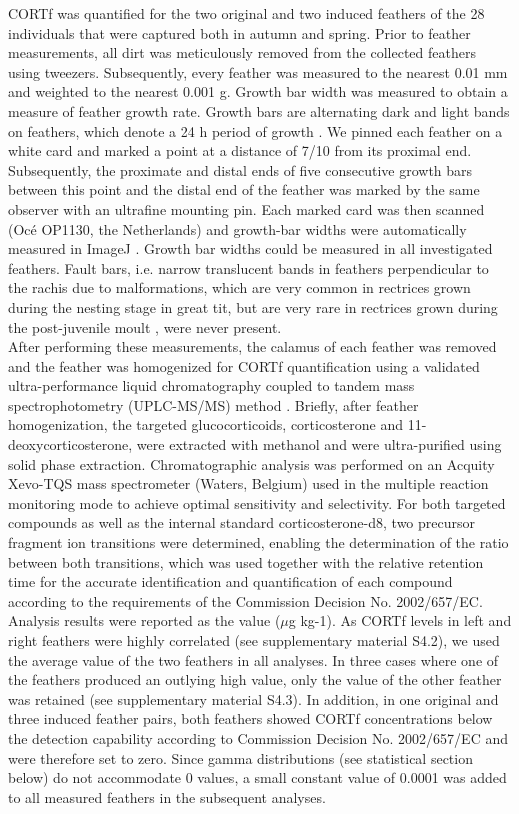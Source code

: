 \documentclass[10pt, twoside]{book} %
\begin{document}
CORTf was quantified for the two original and two induced feathers of the 28 individuals that were captured both in autumn and spring. Prior to feather measurements, all dirt was meticulously removed from the collected feathers using tweezers. Subsequently, every feather was measured to the nearest 0.01 mm and weighted to the nearest 0.001 g. Growth bar width was measured to obtain a measure of feather growth rate. Growth bars are alternating dark and light bands on feathers, which denote a 24 h period of growth \citep{Brodin1993, Grubb2006}. We pinned each feather on a white card and marked a point at a distance of 7/10 from its proximal end. Subsequently, the proximate and distal ends of five consecutive growth bars between this point and the distal end of the feather was marked by the same observer with an ultrafine mounting pin. Each marked card was then scanned (Oc\'{e} OP1130, the Netherlands) and growth-bar widths were automatically measured in ImageJ \citep{Schneider2012}. Growth bar widths could be measured in all investigated feathers. Fault bars, i.e. narrow translucent bands in feathers perpendicular to the rachis due to malformations, which are very common in rectrices grown during the nesting stage in great tit, but are very rare in rectrices grown during the post-juvenile moult \citep{Pap2007}, were never present.\\

After performing these measurements, the calamus of each feather was removed and the feather was homogenized for CORTf quantification using a validated ultra-performance liquid chromatography coupled to tandem mass spectrophotometry (UPLC-MS/MS) method \citep{SallehHudin2018}. Briefly, after feather homogenization, the targeted glucocorticoids, corticosterone and 11-deoxycorticosterone, were extracted with methanol and were ultra-purified using solid phase extraction. Chromatographic analysis was performed on an Acquity Xevo-TQS mass spectrometer (Waters, Belgium) used in the multiple reaction monitoring mode to achieve optimal sensitivity and selectivity. For both targeted compounds as well as the internal standard corticosterone-d8, two precursor fragment ion transitions were determined, enabling the determination of the ratio between both transitions, which was used together with the relative retention time for the accurate identification and quantification of each compound according to the requirements of the Commission Decision No. 2002/657/EC. Analysis results were reported as the value ($\mu$g kg-1). As CORTf levels in left and right feathers were highly correlated (see supplementary material S4.2), we used the average value of the two feathers in all analyses. In three cases where one of the feathers produced an outlying high value, only the value of the other feather was retained (see supplementary material S4.3). In addition, in one original and three induced feather pairs, both feathers showed CORTf concentrations below the detection capability according to Commission Decision No. 2002/657/EC and were therefore set to zero. Since gamma distributions (see statistical section below) do not accommodate 0 values, a small constant value of 0.0001 was added to all measured feathers in the subsequent analyses.\\
	
\end{document}
